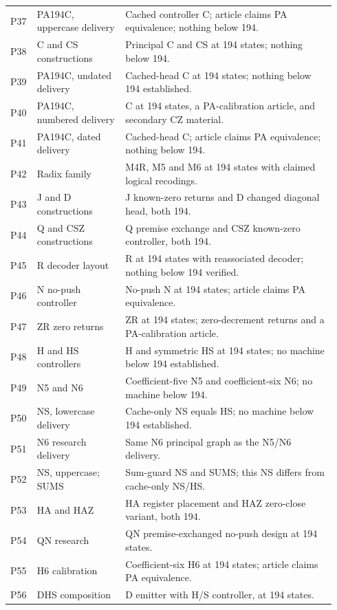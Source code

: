 \begin{longtable}{@{}p{0.06\linewidth}p{0.26\linewidth}p{0.62\linewidth}@{}}
P37 & PA194C, uppercase delivery & Cached controller C; article claims PA equivalence; nothing below 194. \\
P38 & C and CS constructions & Principal C and CS at 194 states; nothing below 194. \\
P39 & PA194C, undated delivery & Cached-head C at 194 states; nothing below 194 established. \\
P40 & PA194C, numbered delivery & C at 194 states, a PA-calibration article, and secondary CZ material. \\
P41 & PA194C, dated delivery & Cached-head C; article claims PA equivalence; nothing below 194. \\
P42 & Radix family & M4R, M5 and M6 at 194 states with claimed logical recodings. \\
P43 & J and D constructions & J known-zero returns and D changed diagonal head, both 194. \\
P44 & Q and CSZ constructions & Q premise exchange and CSZ known-zero controller, both 194. \\
P45 & R decoder layout & R at 194 states with reassociated decoder; nothing below 194 verified. \\
P46 & N no-push controller & No-push N at 194 states; article claims PA equivalence. \\
P47 & ZR zero returns & ZR at 194 states; zero-decrement returns and a PA-calibration article. \\
P48 & H and HS controllers & H and symmetric HS at 194 states; no machine below 194 established. \\
P49 & N5 and N6 & Coefficient-five N5 and coefficient-six N6; no machine below 194. \\
P50 & NS, lowercase delivery & Cache-only NS equals HS; no machine below 194 established. \\
P51 & N6 research delivery & Same N6 principal graph as the N5/N6 delivery. \\
P52 & NS, uppercase; SUMS & Sum-guard NS and SUMS; this NS differs from cache-only NS/HS. \\
P53 & HA and HAZ & HA register placement and HAZ zero-close variant, both 194. \\
P54 & QN research & QN premise-exchanged no-push design at 194 states. \\
P55 & H6 calibration & Coefficient-six H6 at 194 states; article claims PA equivalence. \\
P56 & DHS composition & D emitter with H/S controller, at 194 states. \\

\end{longtable}
